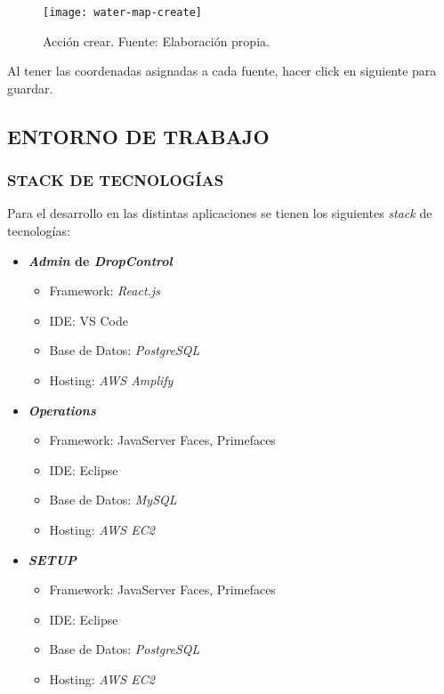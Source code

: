 \begin{figure}[H]
   \centering
   \texttt{[image: water-map-create]}
   \caption{\label{fig:water-map-create} Acción crear. Fuente: Elaboración propia.}
\end{figure}

Al tener las coordenadas asignadas a cada fuente, hacer click en siguiente para guardar.

\subsection{ENTORNO DE TRABAJO}

\subsubsection{STACK DE TECNOLOGÍAS}

Para el desarrollo en las distintas aplicaciones se tienen los siguientes \textit{stack} de tecnologías:

\begin{itemize}
    \item \textbf{\textit{Admin} de \textit{DropControl}}
    \begin{itemize}
        \item Framework: \textit{React.js}
        \item IDE: VS Code
        \item Base de Datos: \textit{PostgreSQL}
        \item Hosting: \textit{AWS Amplify}
    \end{itemize}
    \item \textbf{\textit{Operations}}
    \begin{itemize}
        \item Framework: JavaServer Faces, Primefaces
        \item IDE: Eclipse
        \item Base de Datos: \textit{MySQL}
        \item Hosting: \textit{AWS EC2}
    \end{itemize}
    \item \textbf{\textit{SETUP}}
    \begin{itemize}
        \item Framework: JavaServer Faces, Primefaces
        \item IDE: Eclipse
        \item Base de Datos: \textit{PostgreSQL}
        \item Hosting: \textit{AWS EC2}
    \end{itemize}
\end{itemize}

